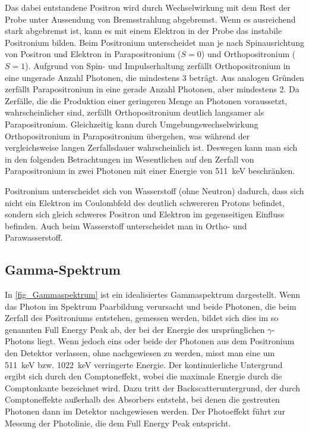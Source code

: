 \documentclass[
	a4paper,
	12pt,
	pagesize,
	ngerman
]{scrartcl}
\begin{document}
	Das dabei entstandene Positron wird durch Wechselwirkung mit dem Rest der Probe unter Aussendung von Bremsstrahlung abgebremst.
	Wenn es ausreichend stark abgebremst ist, kann es mit einem Elektron in der Probe das instabile Positronium bilden.
	Beim Positronium unterscheidet man je nach Spinausrichtung von Positron und Elektron in Parapositronium ($S=0$) und Orthopositronium ($S=1$).
	Aufgrund von Spin- und Impulserhaltung zerfällt Orthopositronium in eine ungerade Anzahl Photonen, die mindestens \num{3} beträgt.
	Aus analogen Gründen zerfällt Parapositronium in eine gerade Anzahl Photonen, aber mindestens \num{2}.
	Da Zerfälle, die die Produktion einer geringeren Menge an Photonen voraussetzt, wahrscheinlicher sind, zerfällt Orthopositronium deutlich langsamer als Parapositronium.
	Gleichzeitig kann durch Umgebungswechselwirkung Orthopositronium in Parapositronium übergehen, was während der vergleichsweise langen Zerfallsdauer wahrscheinlich ist.
	Deswegen kann man sich in den folgenden Betrachtungen im Wesentlichen auf den Zerfall von Parapositronium in zwei Photonen mit einer Energie von \SI{511}{keV} beschränken.

	Positronium unterscheidet sich von Wasserstoff (ohne Neutron) dadurch, dass sich nicht ein Elektron im Coulombfeld des deutlich schwereren Protons befindet, sondern sich gleich schweres Positron und Elektron im gegenseitigen Einfluss befinden.
	Auch beim Wasserstoff unterscheidet man in Ortho- und Parawasserstoff.

	\subsection{Gamma-Spektrum}

		In \cref{fig_Gammaspektrum} ist ein idealisiertes Gammaspektrum dargestellt.
		Wenn das Photon im Spektrum Paarbildung verursacht und beide Photonen, die beim Zerfall des Positroniums entstehen, gemessen werden, bildet sich dies im so genannten Full Energy Peak ab, der bei der Energie des ursprünglichen $\gamma$-Photons liegt.
		Wenn jedoch eins oder beide der Photonen aus dem Positronium den Detektor verlassen, ohne nachgewiesen zu werden, misst man eine um \SI{511}{keV} bzw. \SI{1022}{keV} verringerte Energie.
		Der kontinuierliche Untergrund ergibt sich durch den Comptoneffekt, wobei die maximale Energie durch die Comptonkante bezeichnet wird.
		Dazu tritt der Backscatteruntergrund, der durch Comptoneffekte außerhalb des Absorbers entsteht, bei denen die gestreuten Photonen dann im Detektor nachgewiesen werden.
		Der Photoeffekt führt zur Messung der Photolinie, die dem Full Energy Peak entspricht.
\end{document}
